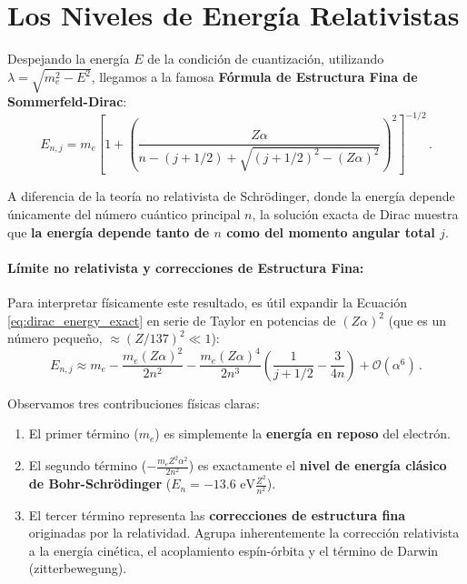 \section{Los Niveles de Energía Relativistas}

Despejando la energía $E$ de la condición de cuantización, utilizando $\lambda = \sqrt{m_e^2 - E^2}$, llegamos a la famosa \textbf{Fórmula de Estructura Fina de Sommerfeld-Dirac}:
\begin{equation}
    E_{n,j} = m_e \left[ 1 + \left( \frac{Z\alpha}{n - (j + 1/2) + \sqrt{(j + 1/2)^2 - (Z\alpha)^2}} \right)^2 \right]^{-1/2} \, .
    \label{eq:dirac_energy_exact}
\end{equation}

A diferencia de la teoría no relativista de Schrödinger, donde la energía depende únicamente del número cuántico principal $n$, la solución exacta de Dirac muestra que \textbf{la energía depende tanto de $n$ como del momento angular total $j$}.

\paragraph{Límite no relativista y correcciones de Estructura Fina:}
Para interpretar físicamente este resultado, es útil expandir la Ecuación \eqref{eq:dirac_energy_exact} en serie de Taylor en potencias de $(Z\alpha)^2$ (que es un número pequeño, $\approx (Z/137)^2 \ll 1$):
\begin{equation}
    E_{n,j} \approx m_e - \frac{m_e (Z\alpha)^2}{2n^2} - \frac{m_e (Z\alpha)^4}{2n^3} \left( \frac{1}{j + 1/2} - \frac{3}{4n} \right) + \mathcal{O}(\alpha^6) \, .
    \label{eq:dirac_expansion}
\end{equation}

Observamos tres contribuciones físicas claras:
\begin{enumerate}
    \item El primer término ($m_e$) es simplemente la \textbf{energía en reposo} del electrón.
    \item El segundo término ($-\frac{m_e Z^2\alpha^2}{2n^2}$) es exactamente el \textbf{nivel de energía clásico de Bohr-Schrödinger} ($E_n = -13.6 \text{ eV} \frac{Z^2}{n^2}$).
    \item El tercer término representa las \textbf{correcciones de estructura fina} originadas por la relatividad. Agrupa inherentemente la corrección relativista a la energía cinética, el acoplamiento espín-órbita y el término de Darwin (zitterbewegung). 
\end{enumerate}

